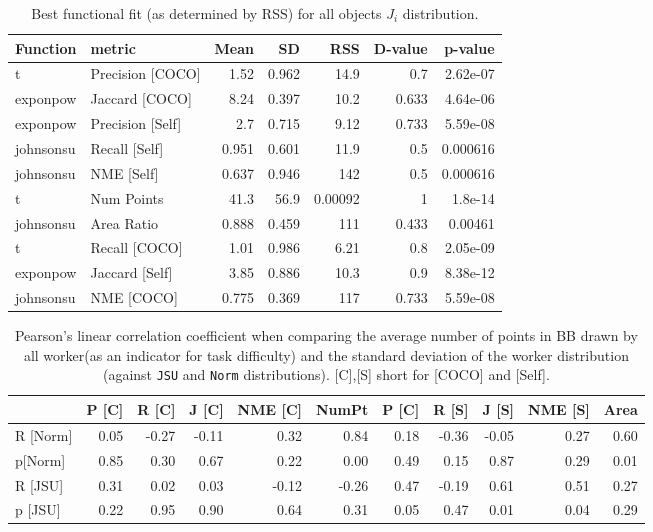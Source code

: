 \documentclass[12pt]{article}
\begin{document}
\begin{appendices}
\begin{table}[ht]
\centering
\begin{tabular}{llrrrrr}
\hline
 Function   & metric           &   Mean &     SD &       RSS &   D-value &   p-value \\
\hline
 t          & Precision [COCO] &  1.52  &  0.962 &  14.9     &     0.7   &  2.62e-07 \\
 exponpow   & Jaccard [COCO]   &  8.24  &  0.397 &  10.2     &     0.633 &  4.64e-06 \\
 exponpow   & Precision [Self] &  2.7   &  0.715 &   9.12    &     0.733 &  5.59e-08 \\
 johnsonsu  & Recall [Self]    &  0.951 &  0.601 &  11.9     &     0.5   &  0.000616 \\
 johnsonsu  & NME [Self]       &  0.637 &  0.946 & 142       &     0.5   &  0.000616 \\
 t          & Num Points       & 41.3   & 56.9   &   0.00092 &     1     &  1.8e-14  \\
 johnsonsu  & Area Ratio       &  0.888 &  0.459 & 111       &     0.433 &  0.00461  \\
 t          & Recall [COCO]    &  1.01  &  0.986 &   6.21    &     0.8   &  2.05e-09 \\
 exponpow   & Jaccard [Self]   &  3.85  &  0.886 &  10.3     &     0.9   &  8.38e-12 \\
 johnsonsu  & NME [COCO]       &  0.775 &  0.369 & 117       &     0.733 &  5.59e-08 \\
\hline
\end{tabular}
\caption{Best functional fit (as determined by RSS) for all objects $J_i$ distribution.}
\label{all_Ji_fit}
\end{table}
\begin{table}[ht]
\centering
\begin{tabular}{lrrrrrrrrrr}
\hline
          &   P [C] &   R [C] &   J [C] &   NME [C] &   NumPt &   P [C] &   R [S] &   J [S] &   NME [S] &   Area \\
\hline
 R [Norm] &    0.05 &   -0.27 &   -0.11 &      0.32 &    0.84 &    0.18 &   -0.36 &   -0.05 &      0.27 &   0.60 \\
 p[Norm]  &    0.85 &    0.30 &    0.67 &      0.22 &    0.00 &    0.49 &    0.15 &    0.87 &      0.29 &   0.01 \\
 R [JSU]  &    0.31 &    0.02 &    0.03 &     -0.12 &   -0.26 &    0.47 &   -0.19 &    0.61 &      0.51 &   0.27 \\
 p [JSU]  &    0.22 &    0.95 &    0.90 &      0.64 &    0.31 &    0.05 &    0.47 &    0.01 &      0.04 &   0.29 \\
\hline
\end{tabular}
\caption{Pearson's linear correlation coefficient when comparing the average number of points in BB drawn by all worker(as an indicator for task difficulty) and the standard deviation of the worker distribution (against \texttt{JSU} and \texttt{Norm} distributions). [C],[S] short for [COCO] and [Self].}
\label{assum3}
\end{table}


\end{appendices}
\end{document}
